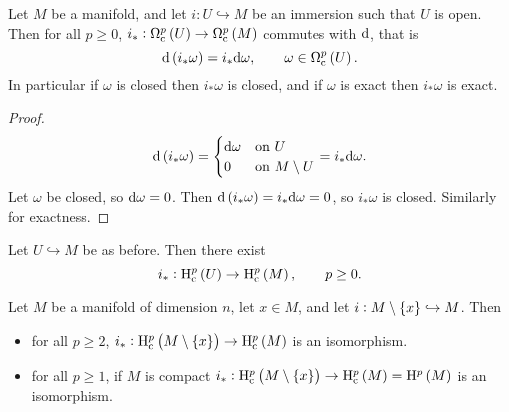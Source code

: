 \pagebreak

\begin{lemma}
Let $ M $ be a manifold, and let $ i : U \hookrightarrow M $ be an immersion such that $ U $ is open. Then for all $ p \ge 0 $, $ i_* : \Omega_\c^p\br{U} \to \Omega_\c^p\br{M} $ commutes with $ \mathrm{d} $, that is
$$ \d\br{i_*\omega} = i_*\d\omega, \qquad \omega \in \Omega_\c^p\br{U}. $$
In particular if $ \omega $ is closed then $ i_*\omega $ is closed, and if $ \omega $ is exact then $ i_*\omega $ is exact.
\end{lemma}

\begin{proof}
$$ \d\br{i_*\omega} =
\begin{cases}
\d\omega & \text{on} \ U \\
0 & \text{on} \ M \setminus U
\end{cases}
= i_*\d\omega. $$
Let $ \omega $ be closed, so $ \mathrm{d}\omega = 0 $. Then $ \d\br{i_*\omega} = i_*\d\omega = 0 $, so $ i_*\omega $ is closed. Similarly for exactness.
\end{proof}

Let $ U \hookrightarrow M $ be as before. Then there exist
$$ i_* : \H_\c^p\br{U} \to \H_\c^p\br{M}, \qquad p \ge 0. $$

\begin{proposition}
\label{prop:2.43}
Let $ M $ be a manifold of dimension $ n $, let $ x \in M $, and let $ i : M \setminus \cbr{x} \hookrightarrow M $. Then
\begin{itemize}
\item for all $ p \ge 2 $, $ i_* : \H_\c^p\br{M \setminus \cbr{x}} \to \H_\c^p\br{M} $ is an isomorphism.
\item for all $ p \ge 1 $, if $ M $ is compact $ i_* : \H_\c^p\br{M \setminus \cbr{x}} \to \H_\c^p\br{M} = \H^p\br{M} $ is an isomorphism.
\end{itemize}
\end{proposition}


